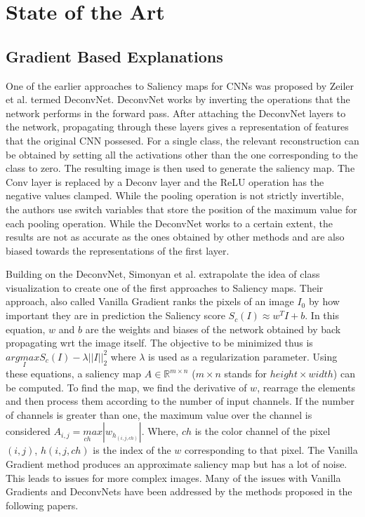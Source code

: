 \chapter{State of the Art}
\section{Gradient Based Explanations}
One of the earlier approaches to Saliency maps for CNNs was proposed by Zeiler et al. \cite{zeilerVisualizingUnderstandingConvolutional2013} termed DeconvNet. DeconvNet works by inverting the operations that the network performs in the forward pass. After attaching the DeconvNet layers to the network, propagating through these layers gives a representation of features that the original CNN possesed. For a single class, the relevant reconstruction can be obtained by setting all the activations other than the one corresponding to the class to zero. The resulting image is then used to generate the saliency map. The Conv layer is replaced by a Deconv layer and the ReLU operation has the negative values clamped. While the pooling operation is not strictly invertible, the authors use switch variables that store the position of the maximum value for each pooling operation. While the DeconvNet works to a certain extent, the results are not as accurate as the ones obtained by other methods and are also biased towards the representations of the first layer.

Building on the DeconvNet, Simonyan et al. \cite{simonyanDeepConvolutionalNetworks2014} extrapolate the idea of class visualization to create one of the first approaches to Saliency maps. Their approach, also called Vanilla Gradient ranks the pixels of an image $I_{0}$ by how important they are in prediction the Saliency score $S_{c}(I) \approx w^{T}I + b$. In this equation, $w$ and $b$ are the weights and biases of the network obtained by back propagating wrt the image itself. The objective to be minimized thus is $arg \underset{I}max S_{c}(I) - \lambda||I||^{2}_{2}$ where $\lambda$ is used as a regularization parameter. Using these equations, a saliency map $A \in \mathbb{R}^{m \times n}$ ($m \times n$ stands for $height \times width$) can be computed. To find the map, we find the derivative of $w$, rearrage the elements and then process them according to the number of input channels. If the number of channels is greater than one, the maximum value over the channel is considered $A_{i,j}= \underset{ch}max |w_{h_{(i,j,ch)}}|$. Where, $ch$ is the color channel of the pixel $(i,j)$, $h(i,j,ch)$ is the index of the $w$ corresponding to that pixel. The Vanilla Gradient method produces an approximate saliency map but has a lot of noise. This leads to issues for more complex images. Many of the issues with Vanilla Gradients and DeconvNets \cite{zeilerVisualizingUnderstandingConvolutional2013} have been addressed by the methods proposed in the following papers.

